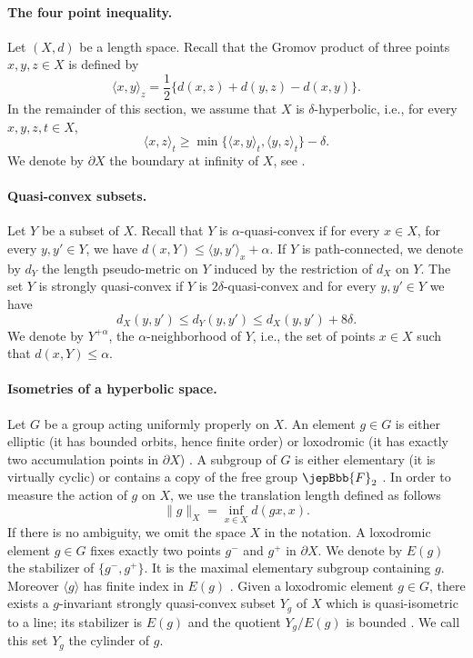\paragraph*{The four point inequality.}
Let $(X,d)$ be a length space. Recall that the Gromov product of three points $x,y,z\in X$ is defined by
\[
\langle x,y\rangle_z=\frac12\{d(x,z)+d(y,z)-d(x,y)\}.
\]
In the remainder of this section, we assume that $X$ is $\delta$-hyperbolic, i.e., for every $x,y,z,t\in X$,
\begin{equation}\label{eq:fourpoint}
\langle x,z\rangle_t\geqslant\min\{\langle x,y\rangle_t,\langle y,z\rangle_t\}-\delta.
\end{equation}
We denote by $\partial X$ the boundary at infinity of $X$, see \cite[Chap.\,2]{ref04}.

\paragraph*{Quasi-convex subsets.}
Let $Y$ be a subset of $X$. Recall that $Y$ is $\alpha$-quasi-convex if for every $x\in X$, for every $y,y'\in Y$, we have $d(x,Y)\leqslant\langle y,y'\rangle_x+\alpha$. If $Y$ is path-connected, we denote by $d_Y$ the length pseudo-metric on $Y$ induced by the restriction of $d_X$ on $Y$. The set $Y$ is strongly quasi-convex if $Y$ is $2\delta$-quasi-convex and for every $y,y'\in Y$ we have
\[
d_X(y,y')\leqslant d_Y(y,y')\leqslant d_X(y,y')+8\delta.
\]
We denote by $Y^{+\alpha}$, the $\alpha$-neighborhood of $Y$, i.e., the set of points $x\in X$ such that $d(x,Y)\leqslant\alpha$.

\paragraph*{Isometries of a hyperbolic space.}
Let $G$ be a group acting uniformly properly on $X$. An element $g\in G$ is either elliptic (it has bounded orbits, hence finite order) or loxodromic (it has exactly two accumulation points in $\partial X$) \cite[Lem.\,2.2]{ref02}. A subgroup of $G$ is either elementary (it is virtually cyclic) or contains a copy of the free group $\jepBbb{F}_2$ \cite[\S8.2]{ref11}. In order to measure the action of $g$ on $X$, we use the translation length defined as follows
\[
\|g\|_X=\inf_{x\in X}d(gx,x).
\]
If there is no ambiguity, we omit the space $X$ in the notation. A loxodromic element $g\in G$ fixes exactly two points $g^-$ and $g^+$ in $\partial X$. We denote by $E(g)$ the stabilizer of $\{g^-,g^+\}$. It is the maximal elementary subgroup containing $g$. Moreover $\langle g\rangle$ has finite index in $E(g)$ \cite[Lem.\,6.5]{ref08}.
Given a loxodromic element $g\in G$, there exists a $g$-invariant strongly quasi-convex subset $Y_g$ of $X$ which is quasi-isometric to a line; its stabilizer is $E(g)$ and the quotient $Y_g/E(g)$ is bounded \cite[Def.\,3.12 and Lemma~3.13]{ref07}. We call this set $Y_g$ the cylinder of $g$.

